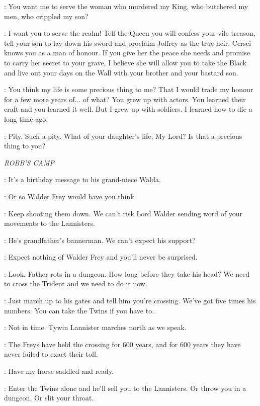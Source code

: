 \NED: You want me to serve the woman who murdered my King, who butchered my men, who crippled my son? 

\VARYS: I want you to serve the realm! Tell the Queen you will confess your vile treason, tell your son to lay down his sword and proclaim Joffrey as the true heir. Cersei knows you as a man of honour. If you give her the peace she needs and promise to carry her secret to your grave, I believe she will allow you to take the Black and live out your days on the Wall with your brother and your bastard son. 

\NED: You think my life is some precious thing to me? That I would trade my honour for a few more years of$\ldots$ of what? You grew up with actors. You learned their craft and you learned it well. But I grew up with soldiers. I learned how to die a long time ago. 

\VARYS: Pity. Such a pity. What of your daughter's life, My Lord? Is that a precious thing to you? 


\scene

\textit{ROBB'S CAMP} 


\ROBB: It's a birthday message to his grand-niece Walda. 

\THEON: Or so Walder Frey would have you think. 

\CATELYN: Keep shooting them down. We can't risk Lord Walder sending word of your movements to the Lannisters. 

\ROBB: He's grandfather's bannerman. We can't expect his support? 

\UMBER: Expect nothing of Walder Frey and you'll never be surprised. 

\ROBB: Look. Father rots in a dungeon. How long before they take his head? We need to cross the Trident and we need to do it now. 

\THEON: Just march up to his gates and tell him you're crossing. We've got five times his numbers. You can take the Twins if you have to. 

\UMBER: Not in time. Tywin Lannister marches north as we speak. 

\CATELYN: The Freys have held the crossing for 600 years, and for 600 years they have never failed to exact their toll. 

\ROBB: Have my horse saddled and ready. 

\UMBER: Enter the Twins alone and he'll sell you to the Lannisters. Or throw you in a dungeon. Or slit your throat. 

